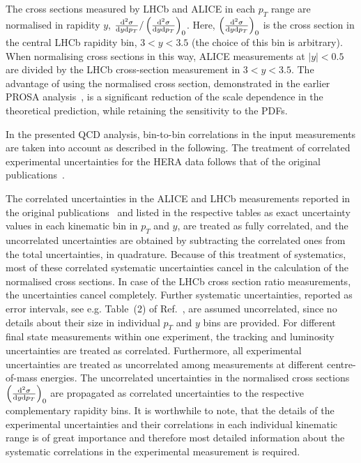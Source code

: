 The cross sections measured by LHCb and ALICE in each $p_T$ range are normalised in rapidity $y$, $\frac{{\rm d}^2\sigma}{{\rm d}y{\rm d}p_T} / \left(\frac{{\rm d}^2\sigma}{{\rm d}y{\rm d}p_T}\right)_{0}$. Here, $\left(\frac{{\rm d}^2\sigma}{{\rm d}y{\rm d}p_T}\right)_{0}$ is the cross section in the central LHCb rapidity bin, $3 < y < 3.5$ {\color{blue}(the choice of this bin is arbitrary)}. 
When normalising cross sections in this way, ALICE measurements at $|y| < 0.5$ are divided by the LHCb cross-section measurement in $3 < y < 3.5$.
The advantage of using the normalised cross section, demonstrated in the earlier PROSA analysis~\cite{Zenaiev:2015rfa}, 
is a significant reduction of the scale dependence in the theoretical prediction,  while retaining the sensitivity to 
the PDFs. 

In the presented QCD analysis, bin-to-bin correlations in the input measurements are taken into account as described in the following. The treatment of correlated experimental uncertainties for the HERA data follows that of the original publications~\cite{Abramowicz:2015mha,H1:2018flt}.
 
The correlated uncertainties in the ALICE and LHCb measurements reported in the original publications~\cite{Aaij:2016jht, Aaij:2013mga, Aaij:2015bpa, Acharya:2019mgn, Acharya:2017jgo, Aaij:2013noa} and listed in the respective tables as exact uncertainty values in each kinematic bin in $p_T$ and $y$, 
are treated as fully correlated, and the uncorrelated uncertainties are obtained by subtracting the correlated ones from the 
total uncertainties, in quadrature. Because of this treatment of systematics, most of these correlated systematic uncertainties cancel in the calculation of the normalised cross sections. In case of the LHCb cross section ratio measurements, the uncertainties cancel completely. Further systematic uncertainties, reported as error intervals, see e.g. Table~(2) of Ref.~\cite{Aaij:2016jht}, are assumed uncorrelated, since no details about their size in individual $p_T$ and $y$ bins are provided. 
For different final state measurements within one experiment, the tracking and luminosity uncertainties are treated as correlated. 
Furthermore, all experimental uncertainties are treated as uncorrelated among measurements at different centre-of-mass energies. 
The uncorrelated uncertainties in the normalised cross sections $\left(\frac{{\rm d}^2\sigma}{{\rm d}y{\rm d}p_T}\right)_{0}$ are propagated as correlated uncertainties to the respective complementary rapidity bins.
It is worthwhile to note, that the details of the experimental uncertainties and their correlations in each individual kinematic range is of great importance and therefore most detailed information about the systematic correlations in the experimental measurement is required.

